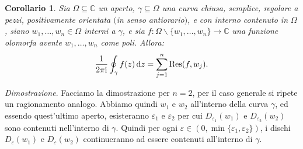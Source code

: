\documentclass[11pt]{book}
\makeatletter
\theoremstyle{Definizione}
\theoremstyle{TeoremaProposizioneLemmaCorollarioCongettura}
\newtheorem{mycor}[myteo]{Corollario}
\theoremstyle{OsservazioneNotaEsempio}
\renewenvironment{proof}[1][\proofname]{\par
  \normalfont \topsep6\p@\@plus6\p@\relax
  \trivlist
  \item[\hskip\labelsep
        \itshape
    #1\@addpunct{.}]\ignorespaces
}{%
  \endtrivlist\@endpefalse
}
\renewenvironment{proof}{\textsl{Dimostrazione}.}{}
\newcommand{\C}{\mathbb{C}}
\newcommand{\Disc}[3][]{D^{#1}_{{#2}}({#3})}
\newcommand{\tolto}{\smallsetminus}
\renewcommand{\i}{\textup{i}}
\renewcommand{\d}{\mathrm{d}}
\newcommand{\dz}{\,\d z}
\newcommand{\Res}{\textup{Res}}
\makeatother
\begin{document}
\begin{boxoss}
\begin{mycor}\label{cor:TeoremaDeiResiduiPiùPoli}
Sia $\Omega\subseteq \C$ un aperto, $\gamma \subseteq \Omega$ una curva chiusa, semplice, regolare a pezzi, positivamente orientata $($in senso antiorario$)$, e con interno contenuto in $\Omega$, siano $w_1,\dots,w_n\in \Omega$ interni a $\gamma$, e sia $f: \Omega \tolto \{w_1,\dots,w_n\} \longrightarrow \C$ una funzione olomorfa avente $w_1,\dots,w_n$ come poli. Allora:
$$
\frac{1}{2\pi\i}\oint_\gamma f(z)\dz = \sum_{j = 1}^n \Res(f,w_j).
$$
\end{mycor}
\tcblower
\begin{proof}
Facciamo la dimostrazione per $n = 2$, per il caso generale si ripete un ragionamento analogo. Abbiamo quindi $w_1$ e $w_2$ all'interno della curva $\gamma$, ed essendo quest'ultimo aperto, esisteranno $\varepsilon_1$ e $\varepsilon_2$ per cui $\Disc{\varepsilon_1}{w_1}$ e $\Disc{\varepsilon_2}{w_2}$ sono contenuti nell'interno di $\gamma$. Quindi per ogni $\varepsilon\in (0,\min\{\varepsilon_1,\varepsilon_2\})$, i dischi $\Disc{\varepsilon}{w_1}$ e $\Disc{\varepsilon}{w_2}$ continueranno ad essere contenuti all'interno di $\gamma$.
\begin{center}
\end{center}
\end{proof}
\end{boxoss}
\end{document}
